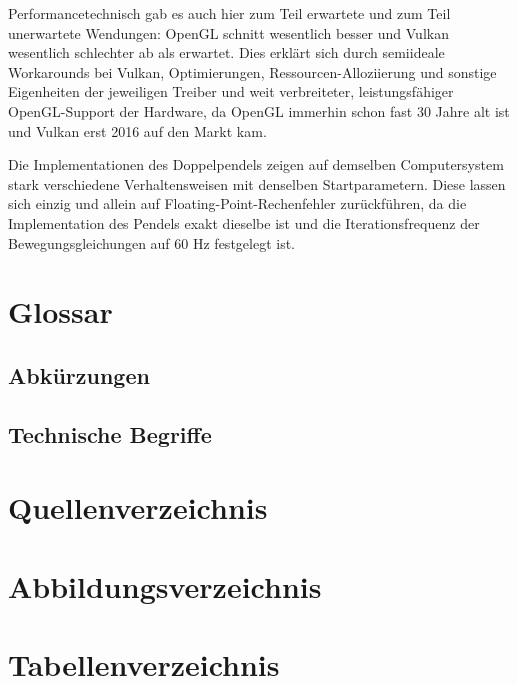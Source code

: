 \documentclass[titlepage, 11pt, a4paper, ngerman]{article}
\begin{document}
Performancetechnisch gab es auch hier zum Teil erwartete und zum Teil unerwartete Wendungen: OpenGL schnitt wesentlich besser und Vulkan wesentlich schlechter ab als erwartet. Dies erklärt sich durch semiideale Workarounds bei Vulkan, Optimierungen, Ressourcen-Alloziierung und sonstige Eigenheiten der jeweiligen Treiber und weit verbreiteter, leistungsfähiger OpenGL-Support der Hardware, da OpenGL immerhin schon fast 30 Jahre alt ist und Vulkan erst 2016 auf den Markt kam.\par
Die Implementationen des Doppelpendels zeigen auf demselben Computersystem stark verschiedene Verhaltensweisen mit denselben Startparametern. Diese lassen sich einzig und allein auf \gls{Floating-Point}-Rechenfehler zurückführen, da die Implementation des Pendels exakt dieselbe ist und die Iterationsfrequenz der Bewegungsgleichungen auf 60 Hz festgelegt ist.


\newpage
\renewcommand{\glossarysection}[2][]{}
\section{Glossar}
\subsection{Abkürzungen}
\printglossary[type=\acronymtype]
\subsection{Technische Begriffe}
\printglossary


\newpage
\makeatletter
\renewcommand\listoffigures{
        \@starttoc{lof}
}
\makeatother
\section{Quellenverzeichnis}
\printbibliography[heading=none]

\makeatletter
\renewcommand\listoftables{
        \@starttoc{lot}
}
\makeatother
\section{Abbildungsverzeichnis}
\listoffigures

\section{Tabellenverzeichnis}
\listoftables

\newpage
\renewcommand{\appendixname}{Anhang}
\renewcommand{\appendixtocname}{Anhang}
\renewcommand{\appendixpagename}{Anhang}
\addappheadtotoc
\appendix
\appendixpage
\end{document}

